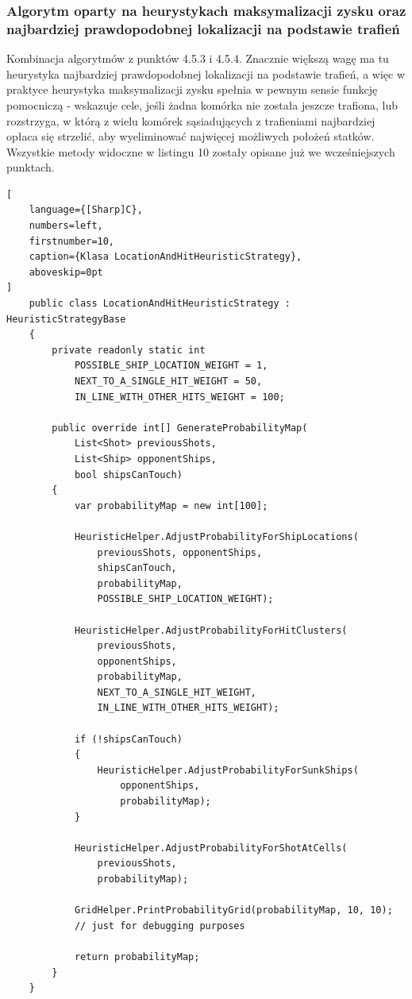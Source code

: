 \subsubsection{Algorytm oparty na heurystykach maksymalizacji zysku oraz najbardziej prawdopodobnej lokalizacji na podstawie trafień}
Kombinacja algorytmów z punktów 4.5.3 i 4.5.4. Znacznie większą wagę ma tu heurystyka najbardziej prawdopodobnej lokalizacji na podstawie trafień, a więc w praktyce heurystyka maksymalizacji zysku spełnia w pewnym sensie funkcję pomocniczą - wskazuje cele, jeśli żadna komórka nie została jeszcze trafiona, lub rozstrzyga, w którą z wielu komórek sąsiadujących z trafieniami najbardziej opłaca się strzelić, aby wyeliminować najwięcej możliwych położeń statków. Wszystkie metody widoczne w listingu 10 zostały opisane już we wcześniejszych punktach.

\begin{addmargin}[10mm]{0mm}
\begin{lstlisting}[
    language={[Sharp]C},
    numbers=left,
    firstnumber=10,
    caption={Klasa LocationAndHitHeuristicStrategy},
    aboveskip=0pt
]
    public class LocationAndHitHeuristicStrategy : HeuristicStrategyBase
    {
        private readonly static int
            POSSIBLE_SHIP_LOCATION_WEIGHT = 1,
            NEXT_TO_A_SINGLE_HIT_WEIGHT = 50,
            IN_LINE_WITH_OTHER_HITS_WEIGHT = 100;

        public override int[] GenerateProbabilityMap(
            List<Shot> previousShots,
            List<Ship> opponentShips,
            bool shipsCanTouch)
        {
            var probabilityMap = new int[100];

            HeuristicHelper.AdjustProbabilityForShipLocations(
                previousShots, opponentShips,
                shipsCanTouch,
                probabilityMap,
                POSSIBLE_SHIP_LOCATION_WEIGHT);

            HeuristicHelper.AdjustProbabilityForHitClusters(
                previousShots,
                opponentShips,
                probabilityMap,
                NEXT_TO_A_SINGLE_HIT_WEIGHT,
                IN_LINE_WITH_OTHER_HITS_WEIGHT);

            if (!shipsCanTouch)
            {
                HeuristicHelper.AdjustProbabilityForSunkShips(
                    opponentShips,
                    probabilityMap);
            }

            HeuristicHelper.AdjustProbabilityForShotAtCells(
                previousShots,
                probabilityMap);

            GridHelper.PrintProbabilityGrid(probabilityMap, 10, 10);
            // just for debugging purposes

            return probabilityMap;
        }
    }
\end{lstlisting}
\end{addmargin}

